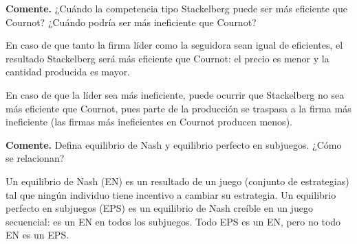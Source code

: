 \question \textbf{Comente.} ¿Cuándo la competencia tipo Stackelberg puede ser más eficiente que Cournot? ¿Cuándo podría ser más ineficiente que Cournot?
\begin{solution}
En caso de que tanto la firma líder como la seguidora sean igual de eficientes, el resultado Stackelberg será más eficiente que Cournot: el precio es menor y la cantidad producida es mayor.

En caso de que la líder sea más ineficiente, puede ocurrir que Stackelberg no sea más eficiente que Cournot, pues parte de la producción se traspasa a la firma más ineficiente (las firmas más ineficientes en Cournot producen menos).

\end{solution}

\question \textbf{Comente.} Defina equilibrio de Nash y equilibrio perfecto en subjuegos. ¿Cómo se relacionan?
\begin{solution}
Un equilibrio de Nash (EN) es un resultado de un juego (conjunto de estrategias) tal que ningún individuo tiene incentivo a cambiar su estrategia. Un equilibrio perfecto en subjuegos (EPS) es un equilibrio de Nash creíble en un juego secuencial: es un EN en todos los subjuegos. Todo EPS es un EN, pero no todo EN es un EPS.

\end{solution}


